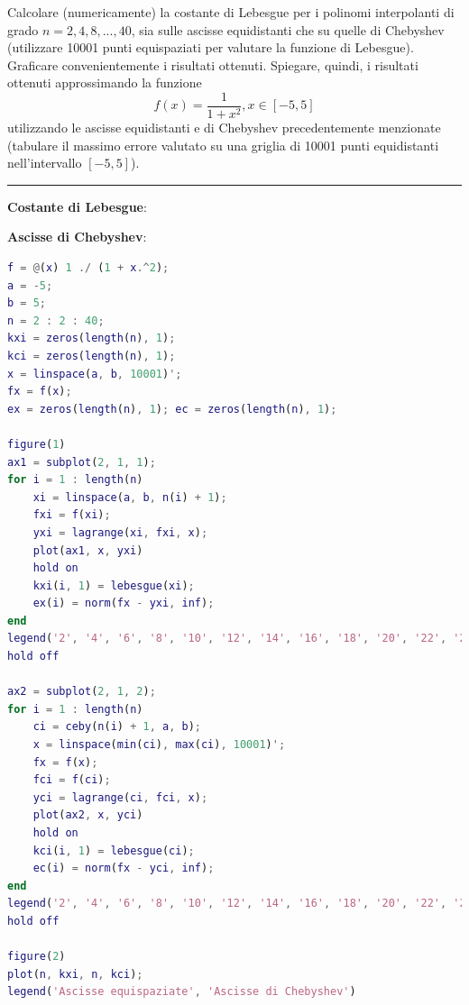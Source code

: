 Calcolare (numericamente) la costante di Lebesgue per i polinomi interpolanti di grado $n = 2, 4, 8, ... , 40$, sia sulle ascisse equidistanti che su quelle di Chebyshev (utilizzare 10001 punti equispaziati per valutare la funzione di Lebesgue). Graficare convenientemente i risultati ottenuti. Spiegare, quindi, i risultati ottenuti approssimando la funzione
$$f(x)=\frac{1}{1+x^{2}},x\in[ - 5,5]$$
utilizzando le ascisse equidistanti e di Chebyshev precedentemente menzionate (tabulare il massimo errore valutato su una griglia di 10001 punti equidistanti nell’intervallo $[ - 5,5]$).

\hspace*{\fill}
\par\noindent\rule{\textwidth}{0.4pt}
\hspace*{\fill}

\textbf{Costante di Lebesgue}:

\textbf{Ascisse di Chebyshev}:


\begin{lstlisting}[language=Matlab, caption=Codice Matlab]
f = @(x) 1 ./ (1 + x.^2);
a = -5;
b = 5;
n = 2 : 2 : 40;
kxi = zeros(length(n), 1);
kci = zeros(length(n), 1);
x = linspace(a, b, 10001)';
fx = f(x);
ex = zeros(length(n), 1); ec = zeros(length(n), 1);

figure(1)
ax1 = subplot(2, 1, 1);
for i = 1 : length(n)
	xi = linspace(a, b, n(i) + 1);
	fxi = f(xi);
	yxi = lagrange(xi, fxi, x);
	plot(ax1, x, yxi)
	hold on
	kxi(i, 1) = lebesgue(xi);
	ex(i) = norm(fx - yxi, inf);
end
legend('2', '4', '6', '8', '10', '12', '14', '16', '18', '20', '22', '24', '26', '28', '30', '32', '34', '36', '38', '40')
hold off

ax2 = subplot(2, 1, 2);
for i = 1 : length(n)
	ci = ceby(n(i) + 1, a, b);
	x = linspace(min(ci), max(ci), 10001)';
	fx = f(x);
	fci = f(ci);
	yci = lagrange(ci, fci, x);
	plot(ax2, x, yci)
	hold on
	kci(i, 1) = lebesgue(ci);
	ec(i) = norm(fx - yci, inf);
end
legend('2', '4', '6', '8', '10', '12', '14', '16', '18', '20', '22', '24', '26', '28', '30', '32', '34', '36', '38', '40')
hold off

figure(2)
plot(n, kxi, n, kci);
legend('Ascisse equispaziate', 'Ascisse di Chebyshev')
\end{lstlisting}

